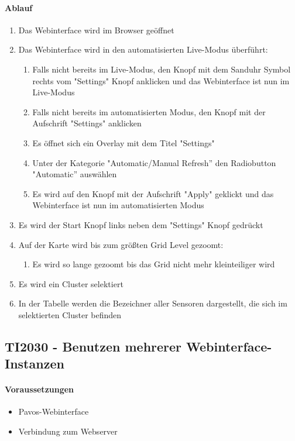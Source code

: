 \paragraph{Ablauf}
\begin{enumerate}
\item Das Webinterface wird im Browser geöffnet
\item Das Webinterface wird in den automatisierten Live-Modus überführt:
\begin{enumerate}
\item Falls nicht bereits im Live-Modus, den Knopf mit dem Sanduhr Symbol rechts vom "Settings" Knopf anklicken und das Webinterface ist nun im Live-Modus
\item Falls nicht bereits im automatisierten Modus, den Knopf mit der Aufschrift "Settings" anklicken
\item Es öffnet sich ein Overlay mit dem Titel "Settings"
\item Unter der Kategorie "Automatic/Manual Refresh'' den Radiobutton "Automatic'' auswählen
\item Es wird auf den Knopf mit der Aufschrift "Apply" geklickt und das Webinterface ist nun im automatisierten Modus
\end{enumerate}
\item Es wird der Start Knopf links neben dem "Settings" Knopf gedrückt
\item Auf der Karte wird bis zum größten Grid Level gezoomt:
\begin{enumerate}
\item Es wird so lange gezoomt bis das Grid nicht mehr kleinteiliger wird
\end{enumerate}
\item Es wird ein Cluster selektiert
\item In der Tabelle werden die Bezeichner aller Sensoren dargestellt, die sich im selektierten Cluster befinden
\end{enumerate}
\szenarioOk

\subsection{TI2030 - Benutzen mehrerer Webinterface-Instanzen}
\paragraph{Voraussetzungen}
\begin{itemize}
\item Pavos-Webinterface
\item Verbindung zum Webserver
\end{itemize}
